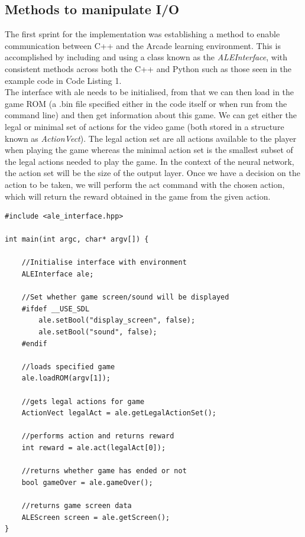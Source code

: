 \documentclass[10pt]{article}
\begin{document}
	\subsection{Methods to manipulate I/O}
		The first sprint for the implementation was establishing a method to enable communication between C++ and the Arcade learning environment. This is accomplished by including and using a class known as the \textit{ALEInterface}, with consistent methods across both the C++ and Python such as those seen in the example code in Code Listing 1.\\
		
		The interface with ale needs to be initialised, from that we can then load in the game ROM (a .bin file specified either in the code itself or when run from the command line) and then get information about this game. We can get either the legal or minimal set of actions for the video game (both stored in a structure known as \textit{ActionVect}). The legal action set are all actions available to the player when playing the game whereas the minimal action set is the smallest subset of the legal actions needed to play the game. In the context of the neural network, the action set will be the size of the output layer. Once we have a decision on the action to be taken, we will perform the act command with the chosen action, which will return the reward obtained in the game from the given action. 	 
		
		\renewcommand{\lstlistingname}{Code Listing}
		\begin{lstlisting}[caption={ALEInterface in C++},label={ALEIO}]	
#include <ale_interface.hpp>

int main(int argc, char* argv[]) {

	//Initialise interface with environment
	ALEInterface ale;
	
	//Set whether game screen/sound will be displayed
	#ifdef __USE_SDL
		ale.setBool("display_screen", false);
		ale.setBool("sound", false);
	#endif

	//loads specified game 
	ale.loadROM(argv[1]); 

	//gets legal actions for game
	ActionVect legalAct = ale.getLegalActionSet();

	//performs action and returns reward
	int reward = ale.act(legalAct[0]);
	
	//returns whether game has ended or not
	bool gameOver = ale.gameOver();

	//returns game screen data
	ALEScreen screen = ale.getScreen();	
}

		\end{lstlisting}
			
\end{document}
